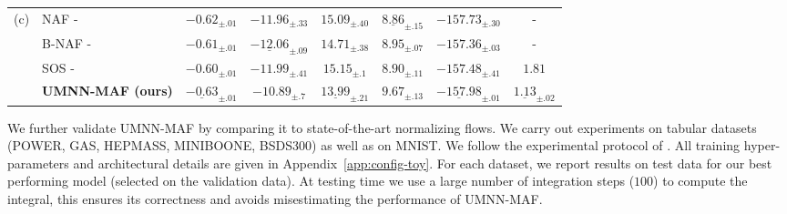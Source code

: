 \begin{table}
\begin{tabular}{l l c c c c c c }
        \multirow{3}{*}{(c)}
        & NAF - \cite{huang_neural_2018}& $-0.62_{\pm.01}$ & $-11.96_{\pm.33}$ & $15.09_{\pm.40}$ & $\mathbf{\underline{8.86}}_{\pm.15}$ & $-157.73_{\pm.30}$ & - \\
        & B-NAF - \cite{de_cao_block_2020}& $-0.61_{\pm.01}$ & $\underline{-12.06}_{\pm.09}$ & $14.71_{\pm.38}$ & $8.95_{\pm.07}$ & $-157.36_{\pm.03}$ & -  \\
        & SOS - \cite{jaini_sum--squares_2019}& $-0.60_{\pm .01}$ & $-11.99_{\pm .41}$ & $15.15_{\pm .1}$ & $8.90_{\pm .11}$ & $-157.48_{\pm .41}$ & $1.81$\\
        & \textbf{UMNN-MAF (ours)}
        & $\mathbf{\underline{-0.63}}_{\pm .01}$
        & $-10.89_{\pm .7}$
        & $\underline{13.99}_{\pm .21}$
        & $9.67_{\pm .13}$
        & $\underline{-157.98}_{\pm .01}$ %
        & $\mathbf{\underline{1.13}}_{\pm.02}$ %
        \\ \hline
    \end{tabular}

\end{table}

We further validate UMNN-MAF by comparing it to state-of-the-art normalizing flows.
We carry out experiments on tabular datasets (POWER, GAS, HEPMASS, MINIBOONE, BSDS300) as well as on MNIST. We follow the experimental protocol of \cite{papamakarios_masked_2017}.
All training hyper-parameters and architectural details are given in Appendix~\ref{app:config-toy}.
For each dataset, we report results on test data for our best performing model (selected on the validation data).
At testing time we use a large number of integration steps ($100$) to compute the integral, this ensures its correctness and avoids misestimating the performance of UMNN-MAF.



